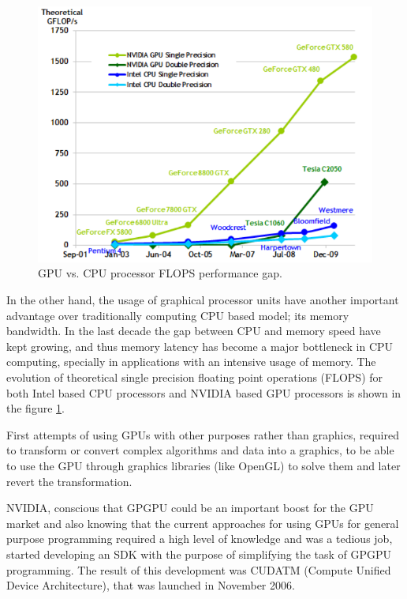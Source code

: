 \documentclass[thesis=M,english]{FITthesis}[2011/07/15]
\begin{document}
\begin{figure}[h]
\centering
\includegraphics[scale=0.45]{images/cpuvsgpu.png}
\caption{GPU vs. CPU processor FLOPS performance gap.}
\label{fig:cpuvsgpu}
\end{figure}

In the other hand, the usage of graphical processor units have another important advantage over traditionally computing CPU based model; its memory bandwidth. In the last decade the gap between CPU and memory speed have kept growing, and thus memory latency has become a major bottleneck in CPU computing, specially in applications with an intensive usage of memory. The evolution of theoretical single precision floating point operations (FLOPS) for both Intel based CPU processors and NVIDIA based GPU processors is shown in the figure \ref{fig:cpuvsgpu}. 

First attempts of using GPUs with other purposes rather than graphics, required to transform or convert complex algorithms and data into a graphics, to be able to use the GPU through graphics libraries (like OpenGL) to solve them and later revert the transformation. 

NVIDIA, conscious that GPGPU could be an important boost for the GPU market and also knowing that the current approaches for using GPUs for general purpose programming required a high level of knowledge and was a tedious job, started developing an SDK with the purpose of simplifying the task of GPGPU programming. The result of this development was CUDATM (Compute Unified Device Architecture), that was launched in November 2006. 
\end{document}
